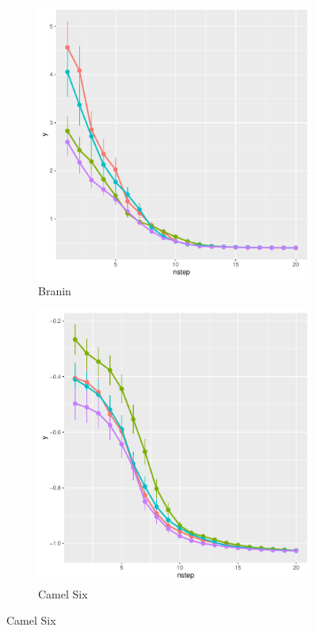 \documentclass [PhD] {package/uclathes}
\begin{document}
\begin{figure}%
\captionsetup[subfigure]{labelformat=empty}
\centering
\begin{subfigure}[b]{0.3\textwidth}
\centering
\caption{Branin}
\includegraphics[width=\textwidth]{chapters/EGO/pdfs/branin_lineplot}
\end{subfigure}
%
\begin{subfigure}[b]{0.3\textwidth}
\centering
\caption{Camel Six}
\includegraphics[width=\textwidth]{chapters/EGO/pdfs/camel6_lineplot}

\end{subfigure}
\end{figure}
\end{document}
